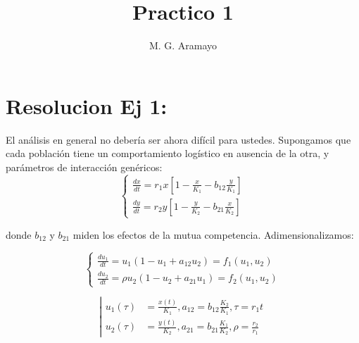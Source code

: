\documentclass[twocolumn,aps,prl]{revtex4-1}
\begin{document}

\title{Practico 1}
\author{M. G. Aramayo}


\maketitle



\section{Resolucion Ej 1:}

El análisis en general no debería ser ahora difícil para ustedes. Supongamos que cada población tiene un comportamiento logístico en ausencia de la otra, y parámetros de interacción genéricos:
$$
\left\{
\begin{aligned}
    \frac{d x}{d t}=r_{1} x\left[1-\frac{x}{K_{1}}-b_{12} \frac{y}{K_{1}}\right] \\
    \frac{d y}{d t}=r_{2} y\left[1-\frac{y}{K_{2}}-b_{21} \frac{x}{K_{2}}\right]
\end{aligned}
\right.
$$

donde $b_{12}$ y $b_{21}$ miden los efectos de la mutua competencia. Adimensionalizamos:

$$
\left\{
\begin{aligned}
    \frac{d u_{1}}{d t}=u_{1}\left(1-u_{1}+a_{12} u_{2}\right)=f_{1}\left(u_{1}, u_{2}\right) \\
    \frac{d u_{2}}{d t}=\rho u_{2}\left(1-u_{2}+a_{21} u_{1}\right)=f_{2}\left(u_{1}, u_{2}\right)
\end{aligned}
\right.
$$

$$
\left\lvert 
\begin{aligned}
u_1(\tau) &= \frac{x(t)}{K_{1}}, a_{12} = b_{12} \frac{K_{2}}{K_{1}}, \tau=r_{1} t \\
u_2(\tau) &= \frac{y(t)}{K_{2}}, a_{21} = b_{21} \frac{K_{1}}{K_{2}}, \rho=\frac{r_{2}}{r_{1}}
\end{aligned}
\right.
$$
\end{document}
